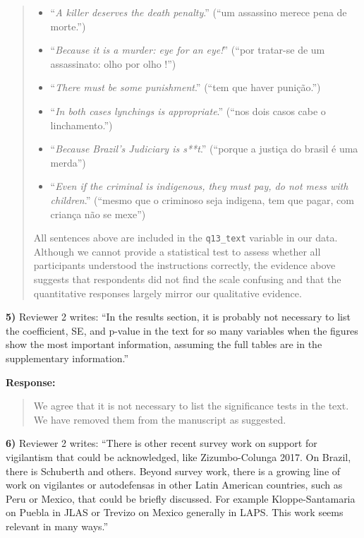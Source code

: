 \documentclass[a4paper,12pt]{article}
\begin{document}
\begin{quote}
\begin{itemize}
  \item ``\textit{A killer deserves the death penalty}.'' (``um assassino merece pena de morte.'')
  \item ``\textit{Because it is a murder: eye for an eye!}'' (``por tratar-se de um assassinato: olho por olho !'')
  \item ``\textit{There must be some punishment}.'' (``tem que haver punição.'')
  \item ``\textit{In both cases lynchings is appropriate}.'' (``nos dois casos cabe o linchamento.'')
  \item ``\textit{Because Brazil's Judiciary is s**t}.'' (``porque a justiça do brasil é uma merda'')
  \item ``\textit{Even if the criminal is indigenous, they must pay, do not mess with children}.'' (``mesmo que o criminoso seja indigena, tem que pagar, com criança não se mexe'')
\end{itemize}

All sentences above are included in the \texttt{q13\_text} variable in our
data. Although we cannot provide a statistical test to assess whether all
participants understood the instructions correctly, the evidence above suggests
that respondents did not find the scale confusing and that the quantitative
responses largely mirror our qualitative evidence.

\end{quote}

\vspace{.3cm}

\noindent \textbf{5)} Reviewer 2 writes: ``In the results section, it is
probably not necessary to list the coefficient, SE, and p-value in the text for
so many variables when the figures show the most important information,
assuming the full tables are in the supplementary information.'' 

\vspace{.3cm}

\noindent \textbf{Response:} 
\begin{quote}

We agree that it is not necessary to list the significance tests in the text.
We have removed them from the manuscript as suggested.

\end{quote}

\vspace{.3cm}

\noindent \textbf{6)} Reviewer 2 writes: ``There is other recent survey work on
support for vigilantism that could be acknowledged, like Zizumbo-Colunga 2017.
On Brazil, there is Schuberth and others. Beyond survey work, there is a
growing line of work on vigilantes or autodefensas in other Latin American
countries, such as Peru or Mexico, that could be briefly discussed. For example
Kloppe-Santamaria on Puebla in JLAS or Trevizo on Mexico generally in LAPS.
This work seems relevant in many ways.''
\end{document}
